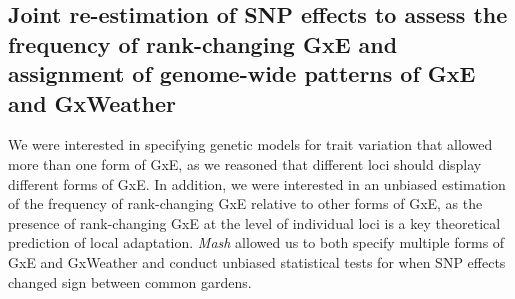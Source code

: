 \documentclass[
  9pt,
  twocolumn,
  twoside]{pnas-new}
\begin{document}
\subsection{Joint re-estimation of SNP effects to assess the frequency
of rank-changing GxE and assignment of genome-wide patterns of GxE and
GxWeather}\label{joint-re-estimation-of-snp-effects-to-assess-the-frequency-of-rank-changing-gxe-and-assignment-of-genome-wide-patterns-of-gxe-and-gxweather}

We were interested in specifying genetic models for trait variation that
allowed more than one form of GxE, as we reasoned that different loci
should display different forms of GxE. In addition, we were interested
in an unbiased estimation of the frequency of rank-changing GxE relative
to other forms of GxE, as the presence of rank-changing GxE at the level
of individual loci is a key theoretical prediction of local adaptation.
\emph{Mash} allowed us to both specify multiple forms of GxE and
GxWeather and conduct unbiased statistical tests for when SNP effects
changed sign between common gardens.
\end{document}

